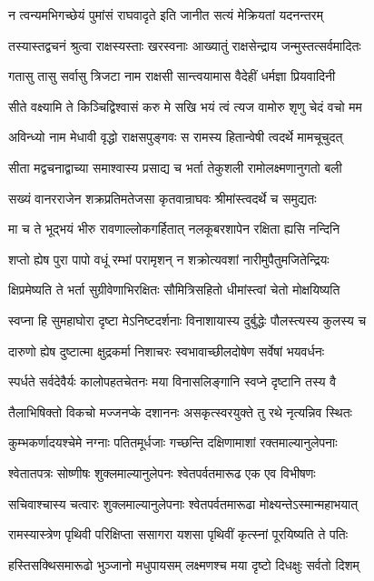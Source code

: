 \twolineshloka
{न त्वन्यमभिगच्छेयं पुमांसं राघवादृते}
{इति जानीत सत्यं मेक्रियतां यदनन्तरम्}


\twolineshloka
{तस्यास्तद्वचनं श्रुत्वा राक्षस्यस्ताः खरस्वनाः}
{आख्यातुं राक्षसेन्द्राय जन्मुस्तत्सर्वमादितः}


\twolineshloka
{गतासु तासु सर्वासु त्रिजटा नाम राक्षसी}
{सान्त्वयामास वैदेहीं धर्मज्ञा प्रियवादिनी}


\twolineshloka
{सीते वक्ष्यामि ते किञ्चिद्विश्वासं करु मे सखि}
{भयं त्वं त्यज वामोरु शृणु चेदं वचो मम}


\twolineshloka
{अविन्ध्यो नाम मेधावी वृद्धो राक्षसपुङ्गवः}
{स रामस्य हितान्वेषी त्वदर्थे मामचूचुदत्}


\twolineshloka
{सीता मद्वचनाद्वाच्या समाश्वास्य प्रसाद्य च}
{भर्ता तेकुशली रामोलक्ष्मणानुगतो बली}


\twolineshloka
{सख्यं वानरराजेन शक्रप्रतिमतेजसा}
{कृतवान्राघवः श्रीमांस्त्वदर्थे च समुद्यतः}


\twolineshloka
{मा च ते भूद्भयं भीरु रावणाल्लोकगर्हितात्}
{नलकूबरशापेन रक्षिता ह्यसि नन्दिनि}


\twolineshloka
{शप्तो ह्येष पुरा पापो वधूं रम्भां परामृशन्}
{न शक्रोत्यवशां नारीमुपैतुमजितेन्द्रियः}


\twolineshloka
{क्षिप्रमेष्यति ते भर्ता सुग्रीवेणाभिरक्षितः}
{सौमित्रिसहितो धीमांस्त्वां चेतो मोक्षयिष्यति}


\twolineshloka
{स्वप्ना हि सुमहाघोरा दृष्टा मेऽनिष्टदर्शनाः}
{विनाशायास्य दुर्बुद्धेः पौलस्त्यस्य कुलस्य च}


\twolineshloka
{दारुणो ह्येष दुष्टात्मा क्षुद्रकर्मा निशाचरः}
{स्वभावाच्छीलदोषेण सर्वेषां भयवर्धनः}


\twolineshloka
{स्पर्धते सर्वदेवैर्यः कालोपहतचेतनः}
{मया विनासलिङ्गानि स्वप्ने दृष्टानि तस्य वै}


\twolineshloka
{तैलाभिषिक्तो विकचो मज्जनप्के दशाननः}
{असकृत्स्वरयुक्ते तु रथे नृत्यन्निव स्थितः}


\twolineshloka
{कुम्भकर्णादयश्चेमे नग्नाः पतितमूर्धजाः}
{गच्छन्ति दक्षिणामाशां रक्तमाल्यानुलेपनाः}


\twolineshloka
{श्वेतातपत्रः सोष्णीषः शुक्लमाल्यानुलेपनः}
{श्वेतपर्वतमारूढ एक एव विभीषणः}


\twolineshloka
{सचिवाश्चास्य चत्वारः शुक्लमाल्यानुलेपनाः}
{श्वेतपर्वतमारूढा मोक्ष्यन्तेऽस्मान्महाभयात्}


\twolineshloka
{रामस्यास्त्रेण पृथिवी परिक्षिप्ता ससागरा}
{यशसा पृथिवीं कृत्स्नां पूरयिष्यति ते पतिः}


\twolineshloka
{हस्तिसक्थिसमारूढो भुञ्जानो मधुपायसम्}
{लक्ष्मणश्च मया दृष्टो दिधक्षुः सर्वतो दिशम्}


